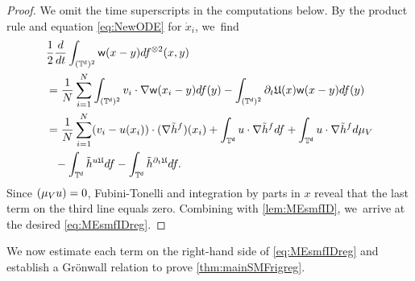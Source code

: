 \documentclass[10pt]{amsart}
\theoremstyle{plain}
\theoremstyle{definition}
\let\div\relax
\DeclareMathOperator{\div}{\mathrm{div}}
\newcommand{\T}{{\mathbb{T}}}
\let\nab\nabla
\let\p\partial
\let\tl\tilde
\newcommand{\ph}{\phantom{=}}
\newcommand{\Uu}{\mathfrak{U}}
\renewcommand{\d}{\mathsf{d}}
\newcommand{\w}{\mathsf{w}}
\begin{document}
\begin{proof}
We omit the time superscripts in the computations below.
By the product rule and equation \eqref{eq:NewODE} for $\dot{x}_i$, we~find
\begin{equation}
\label{eq:dtwff}
\begin{aligned}
&\frac12\frac{d}{dt}\int_{(\T^\d)^2}\w(x-y)df^{\otimes 2}(x,y)\\
&= \frac1N\sum_{i=1}^N\int_{(\T^\d)^2}v_i\cdot \nab\w(x_i-y)df(y) - \int_{(\T^\d)^2} \p_t\Uu(x) \w(x-y)df(y)\\
&=\frac1N\sum_{i=1}^N (v_i-u(x_i))\cdot (\nab\tl{h}^{f})(x_i) + \int_{\T^\d} u\cdot\nab\tl{h}^f df + \int_{\T^\d}u\cdot\nab\tl{h}^f d\mu_V\\
&\ph - \int_{\T^\d} \div \tl{h}^{u\Uu}df -\int_{\T^\d}\tl{h}^{\p_t\Uu} df . 
\end{aligned}
\end{equation}
Since $\div(\mu_V u) = 0$, Fubini-Tonelli and integration by parts in $x$ reveal that the last term on the third line equals zero. Combining with \cref{lem:MEsmfID}, we~arrive at the desired \eqref{eq:MEsmfIDreg}.
\end{proof}

We now estimate each term on the right-hand side of \eqref{eq:MEsmfIDreg} and establish a Grönwall relation to prove \cref{thm:mainSMFrigreg}.
\end{document}
